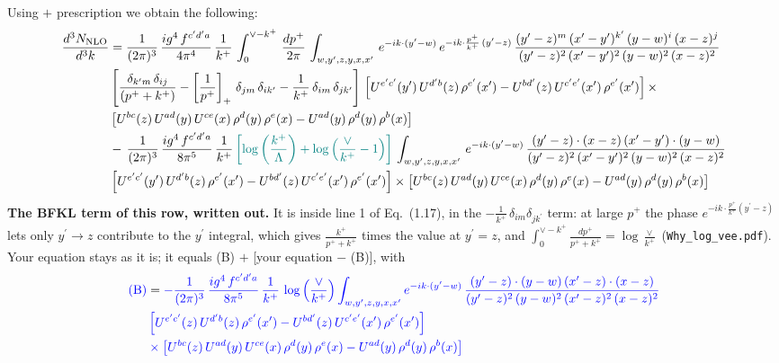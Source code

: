 \documentclass[9pt]{article}
\numberwithin{equation}{section}
\begin{document}
Using $+$ prescription we obtain the following:
\begin{align}
    \frac{d^{3}N_{\rm NLO}}{d^{3}k} & = \frac{1}{(2\pi)^{3}}\, \frac{ig^{4}\,f^{c'd'a}}{4\pi^{4}}\, \frac{1}{k^{+}}\,\int_{0}^{\vee-k^{+}}\, \frac{dp^{+}}{2\pi}\, \int_{w,y',z,y,x,x'}\, e^{-ik\cdot (y'-w)}\, e^{-ik\cdot \frac{p^{+}}{k^{+}}\,(y'-z)}\,\frac{(y'-z)^{m}\,(x'-y')^{k'}\,(y-w)^{i}\,(x-z)^{j}}{(y'-z)^{2}\,(x'-y')^{2}\,(y-w)^{2}\,(x-z)^{2}}\notag \\ & \left[\frac{\delta_{k'm}\,\delta_{ij}}{(p^{+}+k^{+})}-\left[\frac{1}{p^{+}}\right]_{+}\,\delta_{jm}\,\delta_{ik'}-\frac{1}{k^{+}}\, \delta_{im}\, \delta_{jk'}\right]\, \left[U^{e'c'}(y')\,U^{d'b}(z)\,\rho^{e'}(x')-U^{bd'}(z)\,U^{c'e'}(x')\,\rho^{e'}(x')\right]\times\notag \\ &  \left[U^{bc}(z)\,U^{ad}(y)\,U^{ce}(x)\,\rho^{d}(y)\,\rho^{e}(x)-U^{ad}(y)\,\rho^{d}(y)\,\rho^{b}(x)\right]\notag \\ &  -\,\frac{1}{(2\pi)^{3}}\, \frac{ig^{4}\,f^{c'd'a}}{8\pi^{5}}\, \frac{1}{k^{+}}\,{\color{teal}\left[\log{\left(\frac{k^{+}}{\Lambda}\right)}+\log{\left(\frac{\vee}{k^{+}}-1\right)}\right]}\, \int_{w,y',z,y,x,x'}\, e^{-ik\cdot (y'-w)}\,\frac{(y'-z)\cdot (x-z)\,(x'-y')\cdot (y-w)}{(y'-z)^{2}\,(x'-y')^{2}\,(y-w)^{2}\,(x-z)^{2}}\notag \\ & \left[U^{e'c'}(y')\,U^{d'b}(z)\,\rho^{e'}(x')-U^{bd'}(z)\,U^{c'e'}(x')\,\rho^{e'}(x')\right]\times  \left[U^{bc}(z)\,U^{ad}(y)\,U^{ce}(x)\,\rho^{d}(y)\,\rho^{e}(x)-U^{ad}(y)\,\rho^{d}(y)\,\rho^{b}(x)\right]
\end{align}
{\color{blue}\noindent\textbf{The BFKL term of this row, written out.} It is inside line 1 of Eq.~(1.17), in the $-\frac{1}{k^+}\,\delta_{im}\delta_{jk^\prime}$ term: at large $p^+$ the phase $e^{-ik\cdot\frac{p^+}{k^+}(y^\prime-z)}$ lets only $y^\prime\to z$ contribute to the $y^\prime$ integral, which gives $\frac{k^+}{p^++k^+}$ times the value at $y^\prime=z$, and $\int_0^{\vee-k^+}\frac{dp^+}{p^++k^+}=\log\frac{\vee}{k^+}$ (\texttt{Why\_log\_vee.pdf}). Your equation stays as it is; it equals (B) $+$ [your equation $-$ (B)], with}
\begin{align*}
{\color{blue}\text{(B)}} &= \color{blue}-\frac{1}{(2\pi)^{3}}\, \frac{ig^{4}\,f^{c'd'a}}{8\pi^{5}}\, \frac{1}{k^{+}}\,\log{\left(\frac{\vee}{k^{+}}\right)}\int_{w,y',z,y,x,x'} e^{-ik\cdot (y'-w)}\,\frac{(y'-z)\cdot (y-w)\,(x'-z)\cdot (x-z)}{(y'-z)^{2}\,(y-w)^{2}\,(x'-z)^{2}\,(x-z)^{2}}\notag \\
& \color{blue}  \left[U^{e'c'}(z)\,U^{d'b}(z)\,\rho^{e'}(x')-U^{bd'}(z)\,U^{c'e'}(x')\,\rho^{e'}(x')\right]\notag \\
& \color{blue}  \times\left[U^{bc}(z)\,U^{ad}(y)\,U^{ce}(x)\,\rho^{d}(y)\,\rho^{e}(x)-U^{ad}(y)\,\rho^{d}(y)\,\rho^{b}(x)\right]
\end{align*}
\end{document}
